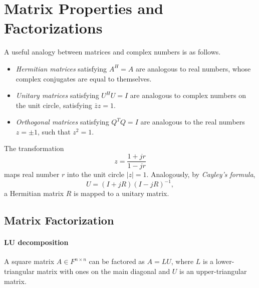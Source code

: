 \chapter{Matrix Properties and Factorizations}

A useful analogy between matrices and complex numbers is as follows.
\begin{itemize}
\item \emph{Hermitian matrices} satisfying $A^H = A$ are analogous to real numbers, whose complex conjugates are equal to themselves.
\item \emph{Unitary matrices} satisfying $U^H U = I$ are analogous to complex numbers on the unit circle, satisfying $\bar{z}z = 1$.
\item \emph{Orthogonal matrices} satisfying $Q^TQ = I$ are analogous to the real numbers $z = \pm 1$, such that $z^2 = 1$.
\end{itemize}

The transformation
\begin{equation*}
z = \frac{1 + jr}{1 - jr}
\end{equation*}
maps real number $r$ into the unit circle $|z| = 1$.
Analogously, by \emph{Cayley's formula},
\begin{equation*}
U = (I + jR) (I - jR)^{-1},
\end{equation*}
a Hermitian matrix $R$ is mapped to a unitary matrix.


\section{Matrix Factorization}

\subsubsection{LU decomposition}

A square matrix $A \in F^{n \times n}$ can be factored as $A = LU$, where $L$ is a lower-triangular matrix with ones on the main diagonal and $U$ is an upper-triangular matrix.

